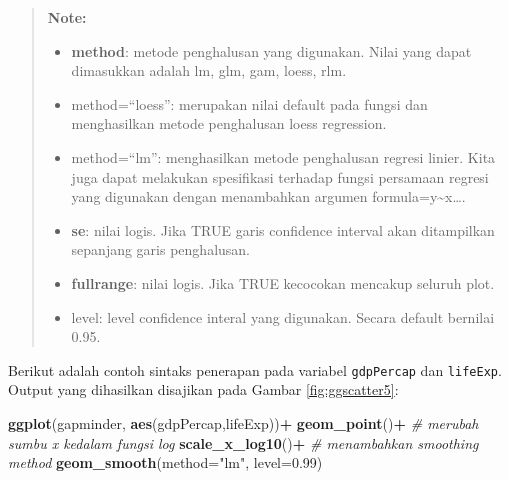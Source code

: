 \documentclass[]{book}
\newenvironment{Shaded}{\begin{snugshade}}{\end{snugshade}}
\newcommand{\KeywordTok}[1]{\textcolor[rgb]{0.13,0.29,0.53}{\textbf{#1}}}
\newcommand{\DataTypeTok}[1]{\textcolor[rgb]{0.13,0.29,0.53}{#1}}
\newcommand{\FloatTok}[1]{\textcolor[rgb]{0.00,0.00,0.81}{#1}}
\newcommand{\StringTok}[1]{\textcolor[rgb]{0.31,0.60,0.02}{#1}}
\newcommand{\CommentTok}[1]{\textcolor[rgb]{0.56,0.35,0.01}{\textit{#1}}}
\newcommand{\OperatorTok}[1]{\textcolor[rgb]{0.81,0.36,0.00}{\textbf{#1}}}
\newcommand{\NormalTok}[1]{#1}
\begin{document}
\begin{quote}
\textbf{Note: }

\begin{itemize}
\item
  \textbf{method}: metode penghalusan yang digunakan. Nilai yang dapat
  dimasukkan adalah lm, glm, gam, loess, rlm.
\item
  method=``loess'': merupakan nilai default pada fungsi dan menghasilkan
  metode penghalusan loess regression.
\item
  method=``lm'': menghasilkan metode penghalusan regresi linier. Kita
  juga dapat melakukan spesifikasi terhadap fungsi persamaan regresi
  yang digunakan dengan menambahkan argumen
  formula=y\textasciitilde{}x\ldots{}.
\item
  \textbf{se}: nilai logis. Jika TRUE garis confidence interval akan
  ditampilkan sepanjang garis penghalusan.
\item
  \textbf{fullrange}: nilai logis. Jika TRUE kecocokan mencakup seluruh
  plot.
\item
  level: level confidence interal yang digunakan. Secara default
  bernilai 0.95.
\end{itemize}
\end{quote}

Berikut adalah contoh sintaks penerapan pada variabel \texttt{gdpPercap}
dan \texttt{lifeExp}. Output yang dihasilkan disajikan pada Gambar
\ref{fig:ggscatter5}:

\begin{Shaded}
\begin{Highlighting}[]
\KeywordTok{ggplot}\NormalTok{(gapminder, }\KeywordTok{aes}\NormalTok{(gdpPercap,lifeExp))}\OperatorTok{+}
\StringTok{  }\KeywordTok{geom_point}\NormalTok{()}\OperatorTok{+}
\StringTok{  }\CommentTok{# merubah sumbu x kedalam fungsi log}
\StringTok{  }\KeywordTok{scale_x_log10}\NormalTok{()}\OperatorTok{+}
\StringTok{  }\CommentTok{# menambahkan smoothing method}
\StringTok{  }\KeywordTok{geom_smooth}\NormalTok{(}\DataTypeTok{method=}\StringTok{"lm"}\NormalTok{, }\DataTypeTok{level=}\FloatTok{0.99}\NormalTok{)}
\end{Highlighting}
\end{Shaded}
\end{document}
